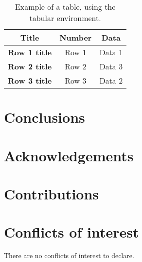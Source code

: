 \documentclass[
    9pt,            %
    twocolumn,      %
    commun,         %
    lineno,         %
    tocfig,         %
]{pi-article}
\begin{document}
\begin{table}[htb]
    \caption{%
        Example of a table, using the tabular environment.
    }\label{tbl:example-table}
    \centering
    \begin{tabular}[]{@{}ccc@{}}
    \toprule
    Title & Number & Data \\
    \midrule
    \textbf{Row 1 title} & Row 1 & Data 1 \\
    \textbf{Row 2 title} & Row 2 & Data 3 \\
    \textbf{Row 3 title} & Row 3 & Data 2 \\
    \bottomrule
    \end{tabular}
\end{table}

\lipsum[2-4] %

\section{Conclusions}
\lipsum[6-6] %

\section*{Acknowledgements}
\lipsum[7-7] %

\section*{Contributions}
\lipsum[8-8] %

\section*{Conflicts of interest}
There are no conflicts of interest to declare.




\end{document}
